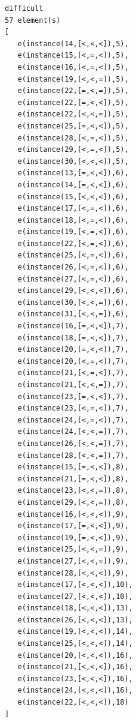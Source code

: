 \documentclass[a4paper, 12]{article}
\begin{document}
\begin{verbatim}
difficult
57 element(s)
[
   e(instance(14,[<,<,<]),5),
   e(instance(15,[<,=,<]),5),
   e(instance(16,[<,=,<]),5),
   e(instance(19,[<,<,=]),5),
   e(instance(22,[=,<,=]),5),
   e(instance(22,[=,<,<]),5),
   e(instance(22,[<,<,=]),5),
   e(instance(25,[=,<,<]),5),
   e(instance(28,[<,=,<]),5),
   e(instance(29,[<,=,<]),5),
   e(instance(30,[<,<,<]),5),
   e(instance(13,[=,<,<]),6),
   e(instance(14,[=,<,<]),6),
   e(instance(15,[<,<,<]),6),
   e(instance(17,[<,=,<]),6),
   e(instance(18,[<,=,<]),6),
   e(instance(19,[<,=,<]),6),
   e(instance(22,[<,=,<]),6),
   e(instance(25,[<,=,<]),6),
   e(instance(26,[<,=,<]),6),
   e(instance(27,[<,=,<]),6),
   e(instance(29,[<,<,<]),6),
   e(instance(30,[<,<,=]),6),
   e(instance(31,[<,<,=]),6),
   e(instance(16,[=,<,<]),7),
   e(instance(18,[=,<,<]),7),
   e(instance(20,[=,<,<]),7),
   e(instance(20,[<,=,<]),7),
   e(instance(21,[<,=,<]),7),
   e(instance(21,[<,<,=]),7),
   e(instance(23,[=,<,<]),7),
   e(instance(23,[<,=,<]),7),
   e(instance(24,[<,=,<]),7),
   e(instance(24,[<,<,=]),7),
   e(instance(26,[<,<,=]),7),
   e(instance(28,[<,<,=]),7),
   e(instance(15,[=,<,<]),8),
   e(instance(21,[=,<,<]),8),
   e(instance(23,[<,<,=]),8),
   e(instance(29,[<,<,=]),8),
   e(instance(16,[<,<,<]),9),
   e(instance(17,[=,<,<]),9),
   e(instance(19,[=,<,<]),9),
   e(instance(25,[<,<,=]),9),
   e(instance(27,[<,<,=]),9),
   e(instance(28,[<,<,<]),9),
   e(instance(17,[<,<,<]),10),
   e(instance(27,[<,<,<]),10),
   e(instance(18,[<,<,<]),13),
   e(instance(26,[<,<,<]),13),
   e(instance(19,[<,<,<]),14),
   e(instance(25,[<,<,<]),14),
   e(instance(20,[<,<,<]),16),
   e(instance(21,[<,<,<]),16),
   e(instance(23,[<,<,<]),16),
   e(instance(24,[<,<,<]),16),
   e(instance(22,[<,<,<]),18)
]
\end{verbatim}
\end{document}

